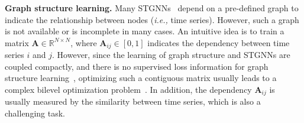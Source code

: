 \documentclass[sigconf]{acmart}
\newcommand{\ie}{\textit{i.e.,}\xspace}
\begin{document}
\noindent\textbf{Graph structure learning.} Many STGNNs~\cite{2017DCRNN, GWNet,2020GMAN} depend on a pre-defined graph to indicate the relationship between nodes (\ie time series). 
However, such a graph is not available or is incomplete in many cases.
An intuitive idea is to train a matrix $\mathbf{A}\in\mathbb{R}^{N\times N}$, where $\mathbf{A}_{ij}\in[0,1]$ indicates the dependency between time series $i$ and $j$.
However, since the learning of graph structure and STGNNs are coupled compactly, and there is no supervised loss information for graph structure learning~\cite{2021REST}, optimizing such a contiguous matrix usually leads to a complex bilevel optimization problem~\cite{2019LDS}.
In addition, the dependency $\mathbf{A}_{ij}$ is usually measured by the similarity between time series, which is also a challenging task.
\end{document}
